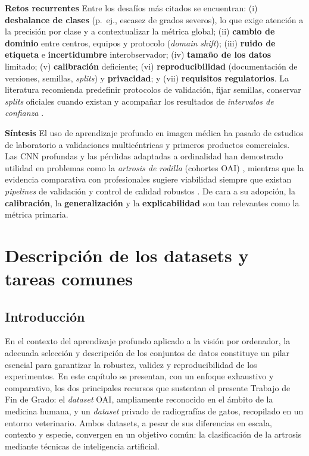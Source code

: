 \documentclass[11pt,spanish,listoffigures,listoftables]{tfgetsinf}
\begin{document}
\medskip
\noindent\textbf{Retos recurrentes} Entre los desafíos más citados se encuentran: (i) \textbf{desbalance de clases} (p.~ej., escasez de grados severos), lo que exige atención a la precisión por clase y a contextualizar la métrica global; (ii) \textbf{cambio de dominio} entre centros, equipos y protocolo (\emph{domain shift}); (iii) \textbf{ruido de etiqueta} e \textbf{incertidumbre} interobservador; (iv) \textbf{tamaño de los datos} limitado; (v) \textbf{calibración} deficiente; (vi) \textbf{reproducibilidad} (documentación de versiones, semillas, \emph{splits}) y \textbf{privacidad}; y (vii) \textbf{requisitos regulatorios}. La literatura recomienda predefinir protocolos de validación, fijar semillas, conservar \emph{splits} oficiales cuando existan y acompañar los resultados de \emph{intervalos de confianza} \cite{liu_meta_analysis}.

\medskip
\noindent\textbf{Síntesis} El uso de aprendizaje profundo en imagen médica ha pasado de estudios de laboratorio a validaciones multicéntricas y primeros productos comerciales. Las CNN profundas y las pérdidas adaptadas a ordinalidad han demostrado utilidad en problemas como la \emph{artrosis de rodilla} (cohortes OAI) \cite{niamsOAI,chen2019fully}, mientras que la evidencia comparativa con profesionales sugiere viabilidad siempre que existan \emph{pipelines} de validación y control de calidad robustos \cite{liu_meta_analysis}. De cara a su adopción, la \textbf{calibración}, la \textbf{generalización} y la \textbf{explicabilidad} son tan relevantes como la métrica primaria.





\chapter{Descripción de los datasets y tareas comunes}
\label{chap:corpus}

\section{Introducción}
\label{sec:3_1_introduccion}

En el contexto del aprendizaje profundo aplicado a la visión por ordenador, la adecuada selección y descripción de los conjuntos de datos constituye un pilar esencial para garantizar la robustez, validez y reproducibilidad de los experimentos. En este capítulo se presentan, con un enfoque exhaustivo y comparativo, los dos principales recursos que sustentan el presente Trabajo de Fin de Grado: el \textit{dataset} OAI, ampliamente reconocido en el ámbito de la medicina humana, y un \textit{dataset} privado de radiografías de gatos, recopilado en un entorno veterinario. Ambos datasets, a pesar de sus diferencias en escala, contexto y especie, convergen en un objetivo común: la clasificación de la artrosis mediante técnicas de inteligencia artificial.
\end{document}

